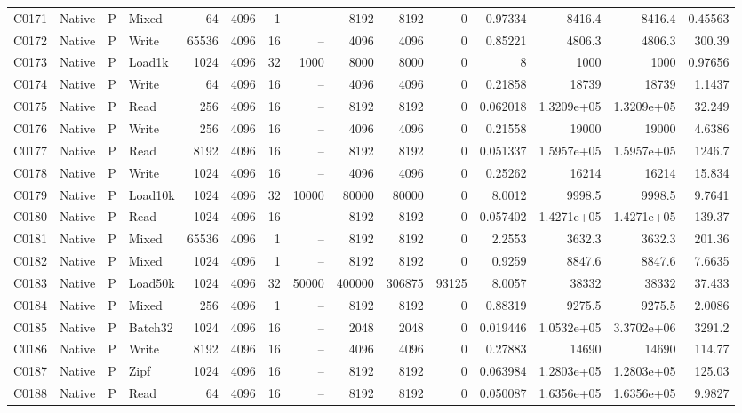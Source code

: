 \begin{landscape}
\begin{longtable}{llllrrrrrrrrrrr}
C0171 & Native & P & Mixed & 64 & 4096 & 1 & -- & 8192 & 8192 & 0 & 0.97334 & 8416.4 & 8416.4 & 0.45563\\
C0172 & Native & P & Write & 65536 & 4096 & 16 & -- & 4096 & 4096 & 0 & 0.85221 & 4806.3 & 4806.3 & 300.39\\
C0173 & Native & P & Load1k & 1024 & 4096 & 32 & 1000 & 8000 & 8000 & 0 & 8 & 1000 & 1000 & 0.97656\\
C0174 & Native & P & Write & 64 & 4096 & 16 & -- & 4096 & 4096 & 0 & 0.21858 & 18739 & 18739 & 1.1437\\
C0175 & Native & P & Read & 256 & 4096 & 16 & -- & 8192 & 8192 & 0 & 0.062018 & 1.3209e+05 & 1.3209e+05 & 32.249\\
C0176 & Native & P & Write & 256 & 4096 & 16 & -- & 4096 & 4096 & 0 & 0.21558 & 19000 & 19000 & 4.6386\\
C0177 & Native & P & Read & 8192 & 4096 & 16 & -- & 8192 & 8192 & 0 & 0.051337 & 1.5957e+05 & 1.5957e+05 & 1246.7\\
C0178 & Native & P & Write & 1024 & 4096 & 16 & -- & 4096 & 4096 & 0 & 0.25262 & 16214 & 16214 & 15.834\\
C0179 & Native & P & Load10k & 1024 & 4096 & 32 & 10000 & 80000 & 80000 & 0 & 8.0012 & 9998.5 & 9998.5 & 9.7641\\
C0180 & Native & P & Read & 1024 & 4096 & 16 & -- & 8192 & 8192 & 0 & 0.057402 & 1.4271e+05 & 1.4271e+05 & 139.37\\
C0181 & Native & P & Mixed & 65536 & 4096 & 1 & -- & 8192 & 8192 & 0 & 2.2553 & 3632.3 & 3632.3 & 201.36\\
C0182 & Native & P & Mixed & 1024 & 4096 & 1 & -- & 8192 & 8192 & 0 & 0.9259 & 8847.6 & 8847.6 & 7.6635\\
C0183 & Native & P & Load50k & 1024 & 4096 & 32 & 50000 & 400000 & 306875 & 93125 & 8.0057 & 38332 & 38332 & 37.433\\
C0184 & Native & P & Mixed & 256 & 4096 & 1 & -- & 8192 & 8192 & 0 & 0.88319 & 9275.5 & 9275.5 & 2.0086\\
C0185 & Native & P & Batch32 & 1024 & 4096 & 16 & -- & 2048 & 2048 & 0 & 0.019446 & 1.0532e+05 & 3.3702e+06 & 3291.2\\
C0186 & Native & P & Write & 8192 & 4096 & 16 & -- & 4096 & 4096 & 0 & 0.27883 & 14690 & 14690 & 114.77\\
C0187 & Native & P & Zipf & 1024 & 4096 & 16 & -- & 8192 & 8192 & 0 & 0.063984 & 1.2803e+05 & 1.2803e+05 & 125.03\\
C0188 & Native & P & Read & 64 & 4096 & 16 & -- & 8192 & 8192 & 0 & 0.050087 & 1.6356e+05 & 1.6356e+05 & 9.9827\\

\end{longtable}
\end{landscape}
